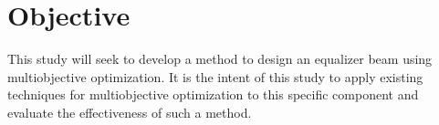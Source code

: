 \section{Objective}
This study will seek to develop a method to design an equalizer beam using multiobjective optimization. It is the intent of this study to apply existing techniques for multiobjective optimization to this specific component and evaluate the effectiveness of such a method. 

